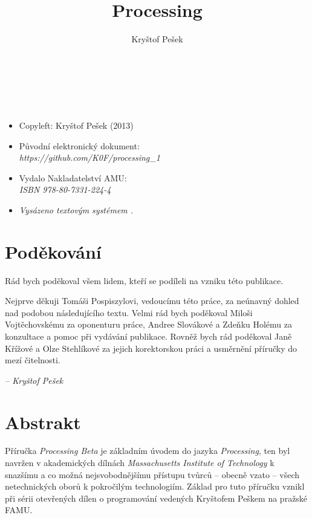 \documentclass[10pt,twoside=true,open=right,cleardoublepage=empty,chapterprefix=true]{scrbook}
\title{Processing}
\author{Kryštof Pešek}
\date{} %
\newcommand{\oddilN}[1]{\section*{#1}\index{#1}\label{#1}}
\newcommand{\lnb}{\linebreak}
\newcommand{\nlb}{\linebreak}
\begin{document}

\makeglossary
\makeglossaries


\newpage
\ 

\pagestyle{empty}


\newpage
\ 


\vfill

\begin{itemize}
\item[] Copyleft: Kryštof Pešek (2013)
\item[]
Původní elektronický dokument: \\
{\em https://github.com/K0F/processing\_1}
\item[]
Vydalo Nakladatelství AMU: \\
{\em ISBN 978-80-7331-224-4}
\item[]
{\em Vysázeno textovým systémem \XeLaTeX.}



\end{itemize}

\newpage


\oddilN{Poděkování}
Rád bych poděkoval všem lidem, kteří se podíleli na vzniku této publikace.

Nejprve děkuji Tomáši Pospiszylovi, vedoucímu této práce, za neúnavný dohled nad podobou následujícího textu.  Velmi rád bych poděkoval Miloši \nlb Vojtěchovskému za oponenturu práce, Andree Slovákové a Zdeňku \lnb Holému za konzultace a pomoc při vydávání publikace. Rovněž bych rád poděkoval Janě Křížové a Olze Stehlíkové za jejich korektorskou práci a usměrnění příručky do mezí čitelnosti.


\vspace{5em}

\begin{flushright}
{\em \footnotesize{-- Kryštof Pešek}}
\end{flushright}

\vfill

\newpage

\oddilN{Abstrakt}

Příručka {\em Processing Beta} je základním úvodem do jazyka {\em Processing}, ten byl navržen v akademických dílnách {\em Massachusetts Institute of Technology} k snazšímu a co možná nejsvobodnějšímu přístupu tvůrců -- obecně \lnb vza\-to -- všech netechnických oborů k pokročilým technologiím. Základ pro tuto příručku vznikl při sérii otevřených dílen o programování vedených Kryštofem Peškem na pražské FAMU.
\end{document}
